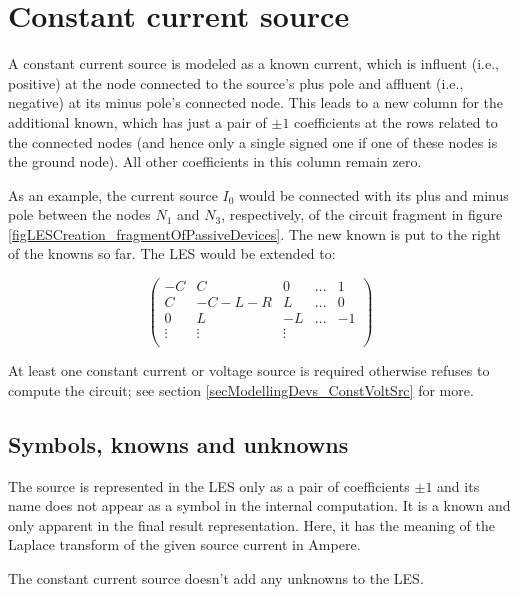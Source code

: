 \section{Constant current source}

A constant current source is modeled as a known current, which is
influent (i.e., positive) at the node connected to the source's plus pole
and affluent (i.e., negative) at its minus pole's connected node. This
leads to a new column for the additional known, which has just a pair of
$\pm 1$ coefficients at the rows related to the connected nodes (and hence
only a single signed one if one of these nodes is the ground node). All
other coefficients in this column remain zero.

As an example, the current source $I_0$ would be connected with its plus
and minus pole between the nodes $N_1$ and $N_3$, respectively, of the
circuit fragment in figure \ref{figLESCreation_fragmentOfPassiveDevices}.
The new known is put to the right of the knowns so far. The LES would be
extended to:

\begin{displaymath}
\left(
\begin{array}{ccccc}
-C      & C      &  0     & \ldots & 1  \\
 C      & -C-L-R &  L     & \ldots & 0  \\
 0      &    L   & -L     & \ldots & -1 \\
 \vdots & \vdots & \vdots &        &    \\
\end{array}
\right)
\end{displaymath}

At least one constant current or voltage source is required otherwise
\linnet{} refuses to compute the circuit; see section
\ref{secModellingDevs_ConstVoltSrc} for more.


\subsection{Symbols, knowns and unknowns}

The source is represented in the LES only as a pair of coefficients $\pm
1$ and its name does not appear as a symbol in the internal computation.
It is a known and only apparent in the final result representation. Here,
it has the meaning of the Laplace transform of the given source current in
Ampere.

The constant current source doesn't add any unknowns to the LES.


